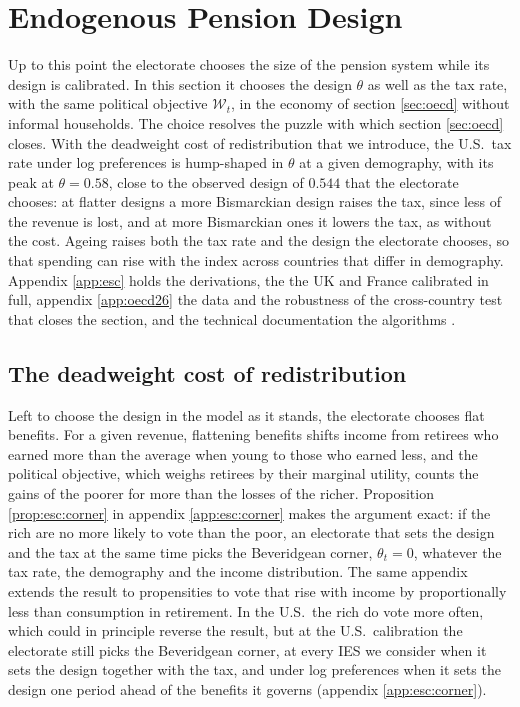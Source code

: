 \section{Endogenous Pension Design}\label{sec:esc}
Up to this point the electorate chooses the size of the pension system while its design is calibrated. In this section it chooses the design $\theta$ as well as the tax rate, with the same political objective $\mathcal{W}_t$, in the economy of section \ref{sec:oecd} without informal households. The choice resolves the puzzle with which section \ref{sec:oecd} closes. With the deadweight cost of redistribution that we introduce, the U.S.\ tax rate under log preferences is hump-shaped in $\theta$ at a given demography, with its peak at $\theta = 0.58$, close to the observed design of $0.544$ that the electorate chooses: at flatter designs a more Bismarckian design raises the tax, since less of the revenue is lost, and at more Bismarckian ones it lowers the tax, as without the cost. Ageing raises both the tax rate and the design the electorate chooses, so that spending can rise with the index across countries that differ in demography. Appendix \ref{app:esc} holds the derivations, the  the UK and France calibrated in full, appendix \ref{app:oecd26} the data and the robustness of the cross-country test that closes the section, and the technical documentation the algorithms \parencite{BergGE26doc}.

\subsection{The deadweight cost of redistribution}\label{sec:esc:cost}
Left to choose the design in the model as it stands, the electorate chooses flat benefits. For a given revenue, flattening benefits shifts income from retirees who earned more than the average when young to those who earned less, and the political objective, which weighs retirees by their marginal utility, counts the gains of the poorer for more than the losses of the richer. Proposition \ref{prop:esc:corner} in appendix \ref{app:esc:corner} makes the argument exact: if the rich are no more likely to vote than the poor, an electorate that sets the design and the tax at the same time picks the Beveridgean corner, $\theta_t = 0$, whatever the tax rate, the demography and the income distribution. The same appendix extends the result to propensities to vote that rise with income by proportionally less than consumption in retirement. In the U.S.\ the rich do vote more often, which could in principle reverse the result, but at the U.S.\ calibration the electorate still picks the Beveridgean corner, at every IES we consider when it sets the design together with the tax, and under log preferences when it sets the design one period ahead of the benefits it governs (appendix \ref{app:esc:corner}).

